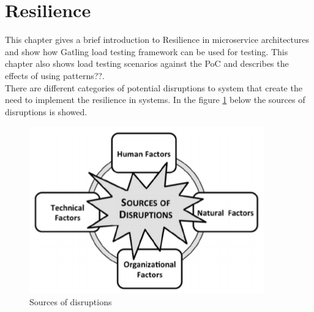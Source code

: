 \chapter{Resilience}\label{ch:resilience}
This chapter gives a brief introduction to Resilience in microservice architectures and show how Gatling load testing framework can be used for testing. This chapter also shows load testing scenarios against the PoC and describes the effects of using patterns??.\\

There are different categories of potential disruptions to system that create the need to implement the resilience in systems. In the figure \ref{ch:resilience} below the sources of disruptions is showed. 

\begin{figure}[bth]
	\includegraphics[width=0.7\linewidth]{gfx/resilience}
	\caption[routingtable]{Sources of disruptions} \label{fig:resilience}
\end{figure}   

